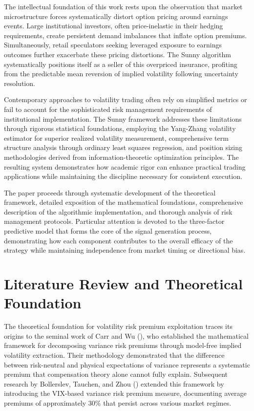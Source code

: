 \documentclass[
  american,
  11pt,
  11pt,
  letterpaper,
  onecolumn]{article}
\begin{document}
The intellectual foundation of this work rests upon the observation that
market microstructure forces systematically distort option pricing
around earnings events. Large institutional investors, often
price-inelastic in their hedging requirements, create persistent demand
imbalances that inflate option premiums. Simultaneously, retail
speculators seeking leveraged exposure to earnings outcomes further
exacerbate these pricing distortions. The Sunny algorithm systematically
positions itself as a seller of this overpriced insurance, profiting
from the predictable mean reversion of implied volatility following
uncertainty resolution.

Contemporary approaches to volatility trading often rely on simplified
metrics or fail to account for the sophisticated risk management
requirements of institutional implementation. The Sunny framework
addresses these limitations through rigorous statistical foundations,
employing the Yang-Zhang volatility estimator for superior realized
volatility measurement, comprehensive term structure analysis through
ordinary least squares regression, and position sizing methodologies
derived from information-theoretic optimization principles. The
resulting system demonstrates how academic rigor can enhance practical
trading applications while maintaining the discipline necessary for
consistent execution.

The paper proceeds through systematic development of the theoretical
framework, detailed exposition of the mathematical foundations,
comprehensive description of the algorithmic implementation, and
thorough analysis of risk management protocols. Particular attention is
devoted to the three-factor predictive model that forms the core of the
signal generation process, demonstrating how each component contributes
to the overall efficacy of the strategy while maintaining independence
from market timing or directional bias.

\section{Literature Review and Theoretical
Foundation}\label{literature-review-and-theoretical-foundation}

The theoretical foundation for volatility risk premium exploitation
traces its origins to the seminal work of Carr and Wu
(\textcite{carr2009}), who established the mathematical framework for
decomposing variance risk premiums through model-free implied volatility
extraction. Their methodology demonstrated that the difference between
risk-neutral and physical expectations of variance represents a
systematic premium that compensation theory alone cannot fully explain.
Subsequent research by Bollerslev, Tauchen, and Zhou
(\textcite{bollerslev2009}) extended this framework by introducing the
VIX-based variance risk premium measure, documenting average premiums of
approximately 30\% that persist across various market regimes.
\end{document}

